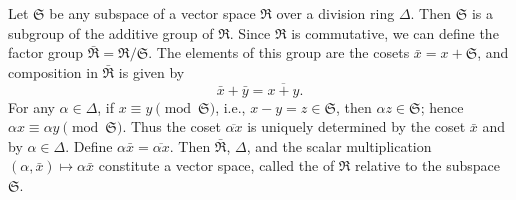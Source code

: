 Let $\mathfrak{S}$ be any subspace of a vector space $\mathfrak{R}$ over a division ring $\Delta$. Then $\mathfrak{S}$ is a subgroup of the additive group of $\mathfrak{R}$. Since $\mathfrak{R}$ is commutative, we can define the factor group $\bar{\mathfrak{R}} = \mathfrak{R} / \mathfrak{S}$. The elements of this group are the cosets $\bar{x} = x + \mathfrak{S}$, and composition in $\bar{\mathfrak{R}}$ is given by
$$
\bar{x} + \bar{y} = \overline{x + y}.
$$
For any $\alpha \in \Delta$, if $x \equiv y \pmod{\mathfrak{S}}$, i.e., $x - y = z \in \mathfrak{S}$, then $\alpha z \in \mathfrak{S}$; hence $\alpha x \equiv \alpha y \pmod{\mathfrak{S}}$. Thus the coset $\overline{\alpha x}$ is uniquely determined by the coset $\bar{x}$ and by $\alpha \in \Delta$. Define $\alpha \bar{x} = \overline{\alpha x}$. Then $\bar{\mathfrak{R}}$, $\Delta$, and the scalar multiplication $(\alpha, \bar{x}) \mapsto \alpha \bar{x}$ constitute a vector space, called the  of $\mathfrak{R}$ relative to the subspace $\mathfrak{S}$.
